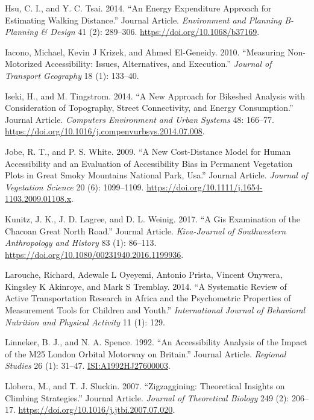 \documentclass[]{elsarticle} %
\begin{document}
\leavevmode\hypertarget{ref-Hsu2014energy}{}%
Hsu, C. I., and Y. C. Tsai. 2014. ``An Energy Expenditure Approach for
Estimating Walking Distance.'' Journal Article. \emph{Environment and
Planning B-Planning \& Design} 41 (2): 289--306.
\url{https://doi.org/10.1068/b37169}.

\leavevmode\hypertarget{ref-iacono2010}{}%
Iacono, Michael, Kevin J Krizek, and Ahmed El-Geneidy. 2010. ``Measuring
Non-Motorized Accessibility: Issues, Alternatives, and Execution.''
\emph{Journal of Transport Geography} 18 (1): 133--40.

\leavevmode\hypertarget{ref-Iseki2014approach}{}%
Iseki, H., and M. Tingstrom. 2014. ``A New Approach for Bikeshed
Analysis with Consideration of Topography, Street Connectivity, and
Energy Consumption.'' Journal Article. \emph{Computers Environment and
Urban Systems} 48: 166--77.
\url{https://doi.org/10.1016/j.compenvurbsys.2014.07.008}.

\leavevmode\hypertarget{ref-Jobe2009new}{}%
Jobe, R. T., and P. S. White. 2009. ``A New Cost-Distance Model for
Human Accessibility and an Evaluation of Accessibility Bias in Permanent
Vegetation Plots in Great Smoky Mountains National Park, Usa.'' Journal
Article. \emph{Journal of Vegetation Science} 20 (6): 1099--1109.
\url{https://doi.org/10.1111/j.1654-1103.2009.01108.x}.

\leavevmode\hypertarget{ref-Kuniz2017}{}%
Kunitz, J. K., J. D. Lagree, and D. L. Weinig. 2017. ``A Gis Examination
of the Chacoan Great North Road.'' Journal Article. \emph{Kiva-Journal
of Southwestern Anthropology and History} 83 (1): 86--113.
\url{https://doi.org/10.1080/00231940.2016.1199936}.

\leavevmode\hypertarget{ref-Larouche2014}{}%
Larouche, Richard, Adewale L Oyeyemi, Antonio Prista, Vincent Onywera,
Kingsley K Akinroye, and Mark S Tremblay. 2014. ``A Systematic Review of
Active Transportation Research in Africa and the Psychometric Properties
of Measurement Tools for Children and Youth.'' \emph{International
Journal of Behavioral Nutrition and Physical Activity} 11 (1): 129.

\leavevmode\hypertarget{ref-Linneker1992accessibility}{}%
Linneker, B. J., and N. A. Spence. 1992. ``An Accessibility Analysis of
the Impact of the M25 London Orbital Motorway on Britain.'' Journal
Article. \emph{Regional Studies} 26 (1): 31--47.
\url{ISI:A1992HJ27600003}.

\leavevmode\hypertarget{ref-Llobera2007}{}%
Llobera, M., and T. J. Sluckin. 2007. ``Zigzaggining: Theoretical
Insights on Climbing Strategies.'' Journal Article. \emph{Journal of
Theoretical Biology} 249 (2): 206--17.
\url{https://doi.org/10.1016/j.jtbi.2007.07.020}.
\end{document}
